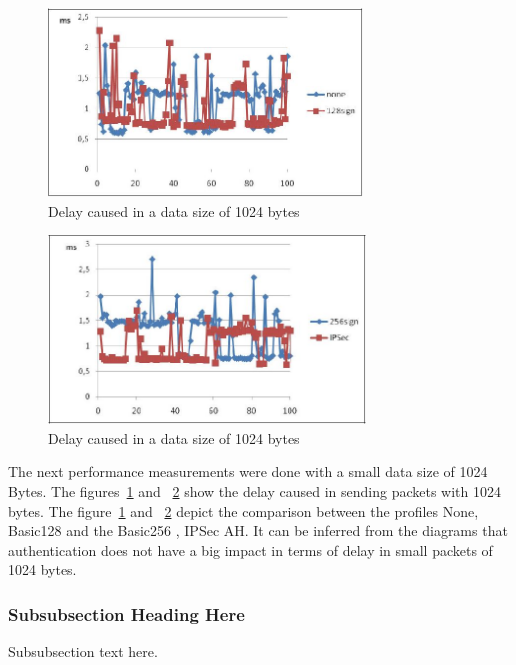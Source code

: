 \documentclass[conference]{IEEEtran}
\begin{document}
\begin{figure}[ht]
\centering
\includegraphics[height=50mm]{Figures/security_fig3}\quad
\caption[Subfigure example]{\label{f:security_fig3}Delay caused in a data size of 1024 bytes \cite{post2009performance}}
\end{figure}

\begin{figure}[ht]
\centering
\includegraphics[height=50mm]{Figures/security_fig4}\quad
\caption[Subfigure example]{\label{f:security_fig4}Delay caused in a data size of 1024 bytes \cite{post2009performance}}
\end{figure}

The next performance measurements were done with a small data size of 1024 Bytes. The figures~\ref{f:security_fig3} and ~\ref{f:security_fig4} show the delay caused in sending packets with 1024 bytes. The figure~\ref{f:security_fig3} and ~\ref{f:security_fig4} depict the comparison between the profiles None, Basic128 and the Basic256 , IPSec AH. It can be inferred from the diagrams that authentication does not have a big impact in terms of delay in small packets of 1024 bytes.	 	 


\subsubsection{Subsubsection Heading Here}
Subsubsection text here.
\end{document}
